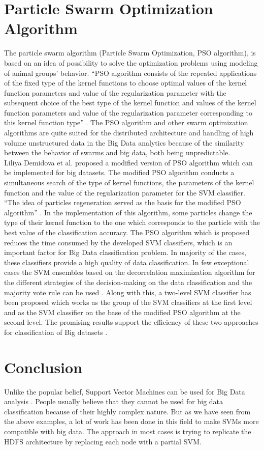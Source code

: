 \documentclass[sigconf]{acmart}
\begin{document}
\section{Particle Swarm Optimization Algorithm}
The particle swarm algorithm (Particle Swarm Optimization, PSO algorithm), is based on an idea of possibility to solve the optimization problems using modeling of animal groups' behavior. ``PSO algorithm consists of the repeated applications of the fixed type of the kernel functions to choose optimal values of the kernel function parameters and value of the regularization parameter with the subsequent choice of the best type of the kernel function and values of the kernel function parameters and value of the regularization parameter corresponding to this kernel function type'' \cite{PSO}. The PSO algorithm and other swarm optimization algorithms are quite suited for the distributed architecture and handling of high volume unstructured data in the Big Data analytics because of the similarity between the behavior of swarms and big data, both being unpredictable. 
\\
Liliya Demidova et al. proposed a modified version of PSO algorithm which can be implemented for big datasets. The modified PSO algorithm conducts a simultaneous search of the type of kernel functions, the parameters of the kernel function and the value of the regularization parameter for the SVM classifier. ``The idea of particles regeneration served as the basis for the modified PSO algorithm'' \cite{PSO}. In the implementation of this algorithm, some particles change the type of their kernel function to the one which corresponds to the particle with the best value of the
classification accuracy. The PSO algorithm which is proposed reduces the time consumed by the developed SVM classifiers, which is an important factor for Big Data classification problem. In majority of the cases, these classifiers provide a high quality of data classification. In few exceptional cases the SVM ensembles based on the decorrelation maximization algorithm for the different strategies of the decision-making on the data classification and the majority vote rule can be used \cite{PSO}. Along with this, a two-level SVM classifier has been proposed which works as the group of the SVM classifiers at the first level and as the SVM classifier on the base of the modified PSO algorithm at the second level. The promising results support the efficiency of these two approaches for classification of Big datasets \cite{PSO}.

\section{Conclusion}
Unlike the popular belief, Support Vector Machines can be used for Big Data analysis . People usually believe that they cannot be used for big data classification because of their highly complex nature. But as we have seen from the above examples, a lot of work has been done in this field to make SVMs more compatible with big data. The approach in most cases is trying to replicate the HDFS architecture by replacing each node with a partial SVM. 
\end{document}
